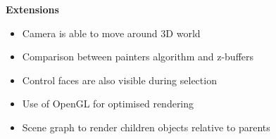 \documentclass[12pt]{article}
\begin{document}
\noindent\textbf{Extensions}
\begin{itemize}
\itemsep0em
\item Camera is able to move around 3D world
\item Comparison between painters algorithm and z-buffers 
\item Control faces are also visible during selection
\item Use of OpenGL for optimised rendering
\item Scene graph to render children objects relative to parents
\end{itemize}

\printbibliography
\end{document}
